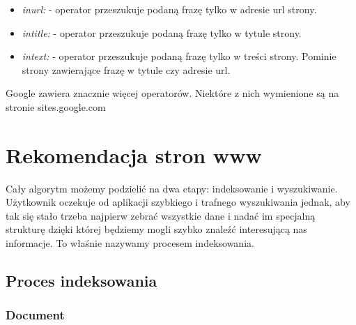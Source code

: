 \documentclass[licencjacka]{pracadypl}
\theoremstyle{definition}
\begin{document}
\begin{itemize}
	\item \emph{inurl:} - operator przeszukuje podaną frazę tylko w adresie url strony.
		
	\item \emph{intitle:} - operator przeszukuje podaną frazę tylko w tytule strony.
	
	\item \emph{intext:} - operator przeszukuje podaną frazę tylko w treści strony. Pominie strony zawierające frazę w tytule czy adresie url.
	
\end{itemize}

Google zawiera znacznie więcej operatorów. Niektóre z nich wymienione są na stronie sites.google.com \cite{operatory-google}

\chapter{Rekomendacja stron www}
Cały algorytm możemy podzielić na dwa etapy: indeksowanie i wyszukiwanie.
Użytkownik oczekuje od aplikacji szybkiego i trafnego wyszukiwania jednak, aby tak się stało trzeba najpierw zebrać wszystkie dane i nadać im specjalną strukturę dzięki której będziemy mogli szybko znaleźć interesującą nas informacje. To właśnie nazywamy procesem indeksowania.


\section{Proces indeksowania}

\subsection{Document}
\end{document}
